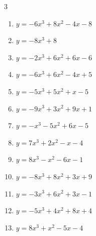 \begin{multicols}{3}
\begin{enumerate}
  \item $y=-6x^{3}+8x^{2}-4x-8$


  \item $y=-8x^{3}+8$


  \item $y=-2x^{3}+6x^{2}+6x-6$


  \item $y=-6x^{3}+6x^{2}-4x+5$


  \item $y=-5x^{3}+5x^{2}+x-5$


  \item $y=-9x^{3}+3x^{2}+9x+1$


  \item $y=-x^{3}-5x^{2}+6x-5$


  \item $y=7x^{3}+2x^{2}-x-4$


  \item $y=8x^{3}-x^{2}-6x-1$


  \item $y=-8x^{3}+8x^{2}+3x+9$


\columnbreak %

  \item $y=-3x^{3}+6x^{2}+3x-1$


  \item $y=-5x^{3}+4x^{2}+8x+4$


  \item $y=8x^{3}+x^{2}-5x-4$


\end{enumerate}
\end{multicols}
